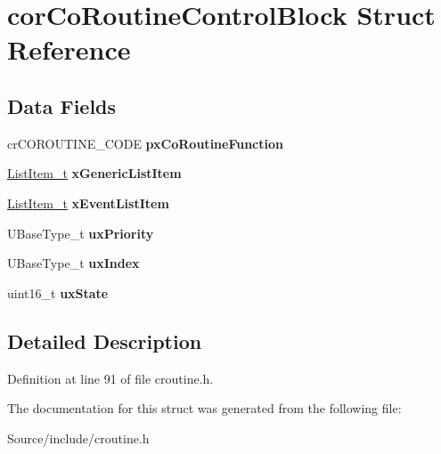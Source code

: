 \hypertarget{structcor_co_routine_control_block}{}\section{cor\+Co\+Routine\+Control\+Block Struct Reference}
\label{structcor_co_routine_control_block}
\subsection*{Data Fields}
\begin{DoxyCompactItemize}
\item 
\hypertarget{structcor_co_routine_control_block_aa842d81ed7b4c345cf52cde20c5b22e5}{}cr\+C\+O\+R\+O\+U\+T\+I\+N\+E\+\_\+\+C\+O\+D\+E {\bfseries px\+Co\+Routine\+Function}\label{structcor_co_routine_control_block_aa842d81ed7b4c345cf52cde20c5b22e5}

\item 
\hypertarget{structcor_co_routine_control_block_ad91115e6e382ba8961310c4559abc7d2}{}\hyperlink{structx_l_i_s_t___i_t_e_m}{List\+Item\+\_\+t} {\bfseries x\+Generic\+List\+Item}\label{structcor_co_routine_control_block_ad91115e6e382ba8961310c4559abc7d2}

\item 
\hypertarget{structcor_co_routine_control_block_a139605d93d834601f34be927ecba3a15}{}\hyperlink{structx_l_i_s_t___i_t_e_m}{List\+Item\+\_\+t} {\bfseries x\+Event\+List\+Item}\label{structcor_co_routine_control_block_a139605d93d834601f34be927ecba3a15}

\item 
\hypertarget{structcor_co_routine_control_block_a0befed3dd0fe55b4314158f4814f50ae}{}U\+Base\+Type\+\_\+t {\bfseries ux\+Priority}\label{structcor_co_routine_control_block_a0befed3dd0fe55b4314158f4814f50ae}

\item 
\hypertarget{structcor_co_routine_control_block_a0a9f1b8d3c0676d256f119fdc5fddfb5}{}U\+Base\+Type\+\_\+t {\bfseries ux\+Index}\label{structcor_co_routine_control_block_a0a9f1b8d3c0676d256f119fdc5fddfb5}

\item 
\hypertarget{structcor_co_routine_control_block_a40a191332ff98e1969a821b870f59531}{}uint16\+\_\+t {\bfseries ux\+State}\label{structcor_co_routine_control_block_a40a191332ff98e1969a821b870f59531}

\end{DoxyCompactItemize}


\subsection{Detailed Description}


Definition at line 91 of file croutine.\+h.



The documentation for this struct was generated from the following file\+:\begin{DoxyCompactItemize}
\item 
Source/include/croutine.\+h\end{DoxyCompactItemize}
